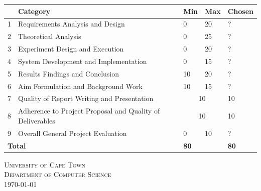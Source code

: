 \begin{titlepage}
\begin{center}
\vfill
\begin{table}[h]
\centering
\begin{tabular}{|l|p{7.5cm}|l|l|l|}
\hline
& \textbf{Category} & \textbf{Min} & \textbf{Max} & \textbf{Chosen} \\
\hline
1 & Requirements Analysis and Design & 0 & 20 & ? \\
\hline
2 & Theoretical Analysis & 0 & 25 & ? \\
\hline
3 & Experiment Design and Execution & 0 & 20 & ? \\
\hline
4 & System Development and Implementation & 0 & 15 & ? \\
\hline
5 & Results Findings and Conclusion & 10 & 20 & ? \\
\hline
6 & Aim Formulation and Background Work & 10 & 15 & ? \\
\hline
7 & Quality of Report Writing and Presentation &
\multicolumn{2}{|c|}{10}  & 10 \\
\hline
8 & Adherence to Project Proposal and Quality of Deliverables &
\multicolumn{2}{|c|}{10}  & 10 \\
\hline
9 & Overall General Project Evaluation & 0 & 10 & ? \\
\hline
\multicolumn{2}{|l|}{\textbf{Total}} & \multicolumn{2}{|l|}{\textbf{80}} & \textbf{80} \\
\hline
\end{tabular}
\end{table}




\textsc{\Large University of Cape Town}\\[0.5cm]
\textsc{\Large Department of Computer Science}\\[0.5cm]
{\large \today}

\end{center}

\end{titlepage}
